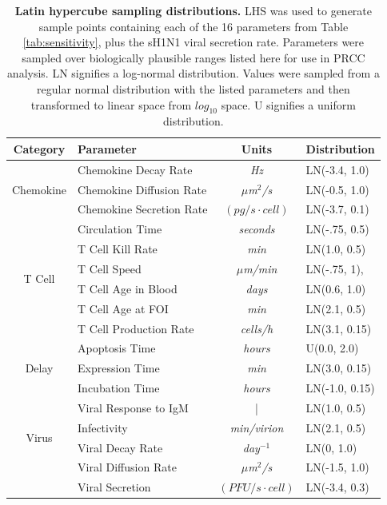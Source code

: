 \documentclass[preprint,10pt,authoryear]{article}
\begin{document}
\begin{table}[!ht]
\centering
\begin{tabular}{| c | l | c | l |}
  \hline                        
  Category & Parameter & Units & Distribution \\
  \hline
  \multirow{3}{*}{Chemokine} & Chemokine Decay Rate & \textit{Hz} &  LN(-3.4, 1.0) \\
  & Chemokine Diffusion Rate & \textit{$\mu$m$^2$/s} & LN(-0.5, 1.0) \\
  & Chemokine Secretion Rate & $(pg/s\cdot cell)$ & LN(-3.7, 0.1) \\
  \hline
  \multirow{6}{*}{T Cell} & Circulation Time & \textit{seconds} & LN(-.75, 0.5)\\
  & T Cell Kill Rate & \textit{min} & LN(1.0, 0.5) \\
  & T Cell Speed & \textit{$\mu$m/min} & LN(-.75, 1), \\
  & T Cell Age in Blood & \textit{days} & LN(0.6, 1.0) \\
  & T Cell Age at FOI& \textit{min} & LN(2.1, 0.5) \\
  & T Cell Production Rate & \textit{cells/h} & LN(3.1, 0.15) \\
  \hline
  \multirow{3}{*}{Delay} & Apoptosis Time & \textit{hours} & U(0.0, 2.0) \\
  & Expression Time & \textit{min} & LN(3.0, 0.15) \\
  & Incubation Time & \textit{hours} & LN(-1.0, 0.15) \\
  \hline 
  \multirow{4}{*}{Virus} & Viral Response to IgM & | & LN(1.0, 0.5) \\
  & Infectivity & \textit{min/virion} & LN(2.1, 0.5) \\
  & Viral Decay Rate &  \textit{day$^{-1}$} & LN(0, 1.0) \\
  & Viral Diffusion Rate & \textit{$\mu$m$^2$/s} & LN(-1.5, 1.0) \\
  & Viral Secretion & $(PFU/s\cdot cell)$ & LN(-3.4, 0.3) \\
  \hline  
\end{tabular}
\caption{\textbf{Latin hypercube sampling distributions.}  LHS was used to generate sample points containing each of the 16 parameters from Table \ref{tab:sensitivity}, plus the sH1N1 viral secretion rate.  Parameters were sampled over biologically plausible ranges listed here for use in PRCC analysis.  LN signifies a log-normal distribution.  Values were sampled from a regular normal distribution with the listed parameters and then transformed to linear space from $log_{10}$ space.  U signifies a uniform distribution.}
\label{tab:lhs}
\end{table}
 
\end{document}
